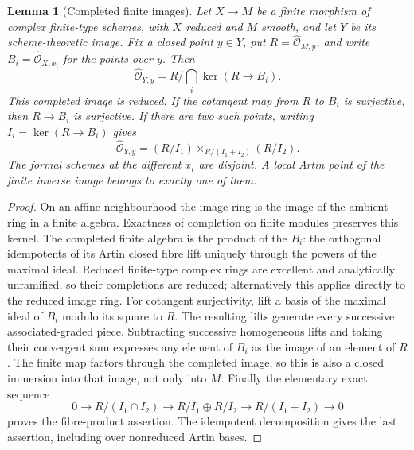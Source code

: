 \documentclass[11pt,reqno]{amsart}
\numberwithin{equation}{section}
\newtheorem{lemma}[theorem]{Lemma}
\theoremstyle{definition}\newtheorem{definition}[theorem]{Definition}
\theoremstyle{remark}\newtheorem{remark}[theorem]{Remark}
\newcommand{\OO}{\mathcal O}\newcommand{\II}{\mathcal I}
\begin{document}
\begin{lemma}[Completed finite images]\label{lem:formal-image-v153}
Let $X\to M$ be a finite morphism of complex finite-type schemes, with
$X$ reduced and $M$ smooth, and let $Y$ be its scheme-theoretic image.
Fix a closed point $y\in Y$, put $R=\widehat{\OO}_{M,y}$, and write
$B_i=\widehat{\OO}_{X,x_i}$ for the points over $y$. Then
\[
 \widehat{\OO}_{Y,y}=R/\bigcap_i\ker(R\to B_i).
\]
This completed image is reduced. If the cotangent map from $R$ to
$B_i$ is surjective, then $R\to B_i$ is surjective. If there are two
such points, writing $I_i=\ker(R\to B_i)$ gives
\[
 \widehat{\OO}_{Y,y}=(R/I_1)\mathbin{\times}_{R/(I_1+I_2)}(R/I_2).
\]
The formal schemes at the different $x_i$ are disjoint. A local Artin
point of the finite inverse image belongs to exactly one of them.
\end{lemma}
\begin{proof}
On an affine neighbourhood the image ring is the image of the
ambient ring in a finite algebra. Exactness of completion on finite
modules preserves this kernel. The completed finite algebra is the
product of the $B_i$: the orthogonal idempotents of its Artin closed
fibre lift uniquely through the powers of the maximal ideal. Reduced
finite-type complex rings are excellent and analytically unramified,
so their completions are reduced; alternatively this applies directly
to the reduced image ring. For cotangent surjectivity, lift a basis
of the maximal ideal of $B_i$ modulo its square to $R$. The resulting
lifts generate every successive associated-graded piece. Subtracting
successive homogeneous lifts and taking their convergent sum expresses
any element of $B_i$ as the image of an element of $R$. The finite map
factors through the completed image, so this is also a closed immersion
into that image, not only into $M$. Finally the elementary exact sequence
\[
0\longrightarrow R/(I_1\cap I_2)\longrightarrow R/I_1\oplus R/I_2
 \longrightarrow R/(I_1+I_2)\longrightarrow0
\]
proves the fibre-product assertion. The idempotent decomposition gives
the last assertion, including over nonreduced Artin bases.
\end{proof}
\end{document}
